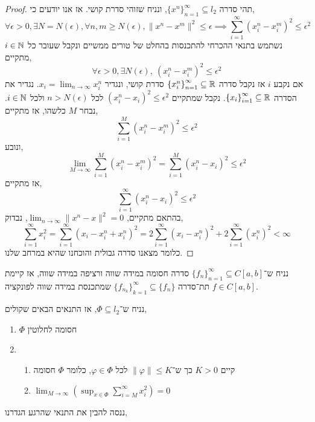 \begin{proof}
	תהי סדרה ${\{ x^n \}}_{n = 1}^\infty \subseteq l_2$, ונניח שזוהי סדרת קושי.
	אז אנו יודעים כי,
	\[
		\forall \epsilon > 0, \exists N = N(\epsilon),
		\forall n, m \ge N(\epsilon), \lVert x^n - x^m \rVert^2 \le \epsilon
		\implies \sum_{i = 1}^\infty {(x_i^n - x_i^m)}^2 \le \epsilon^2
	\]
	נשתמש בתנאי ההכרחי להתכנסות בהחלט של טורים ממשיים ונקבל שעובר כל $i \in \mathbb{N}$ מתקיים,
	\[
		\forall \epsilon > 0, \exists N(\epsilon),\ 
		{(x_i^n - x_i^m)}^2 \le \epsilon^2
	\]
	אם נקבע $i$ אז נקבל סדרה ${\{ x_i^n \}}_{n = 1}^\infty \subseteq \mathbb{R}$ סדרת קושי, ונגדיר $x_i = \lim_{n \to \infty} x_i^n$.
	נגדיר את הסדרה ${\{ x_i \}}_{i = 1}^\infty \subseteq \mathbb{R}$.
	נקבל שמתקיים ${(x_i^n - x_i)}^2 \le \epsilon^2$ לכל $n > N(\epsilon)$ ולכל $i \in \mathbb{N}$.
	נבחר $M$ כלשהו, אז מתקיים,
	\[
		\sum_{i = 1}^M {(x_i^n - x_i^m)}^2 \le \epsilon^2
	\]
	ונובע,
	\[
		\lim_{M \to \infty} \sum_{i = 1}^M {(x_i^n - x_i^m)}^2
		= \sum_{i = 1}^M {(x_i^n - x_i)}^2
		\le \epsilon^2
	\]
	אז מתקיים,
	\[
		\sum_{i = 1}^\infty {(x_i^n - x_i)}^2 \le \epsilon^2
	\]
	בהתאם מתקיים, $\lim_{n \to \infty} \lVert x^n - x\rVert^2 = 0$, נבדוק,
	\[
		\sum_{i = 1}^\infty x_i^2
		= \sum_{i = 1}^\infty {(x_i - x_i^n + x_i^n)}^2
		= 2 \sum_{i = 1}^\infty {(x_i - x_i^n)}^2 + 2 \sum_{i = 1}^\infty {(x_i^n)}^2
		< \infty
	\]
	כלומר מצאנו סדרה גבולית והוכחנו שהיא במרחב שלנו.
\end{proof}
\begin{corollary}
	נניח ש־${\{ f_n \}}_{n = 1}^\infty \subseteq C[a, b]$ סדרה חסומה במידה שווה ורציפה במידה שווה,
	אז קיימת תת־סדרה ${\{ f_{n_k} \}}_{k = 1}^\infty \subseteq \{ f_n \}$ שמתכנסת במידה שווה לפונקציה $f \in C[a, b]$.
\end{corollary}
\begin{theorem}
	נניח ש־$\Phi \subseteq l_2$, אז התנאים הבאים שקולים,
	\begin{enumerate}
		\item $\Phi$ חסומה לחלוטין
		\item \begin{enumerate}
				\item קיים $K > 0$ כך ש־$\lVert \varphi \rVert \le K$ לכל $\varphi \in \Phi$, כלומר $\Phi$ חסומה
				\item $\lim_{M \to \infty} \left( \sup_{x \in \Phi} \sum_{i = M}^\infty x_i^2 \right) = 0$
		\end{enumerate}
	\end{enumerate}
\end{theorem}
ננסה להבין את התנאי שהרגע הגדרנו,
